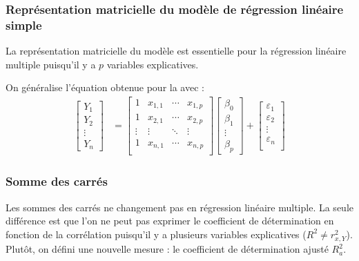 \documentclass[french]{article}
\begin{document}
\begin{multicols*}{2}
\subsubsection{Représentation matricielle du modèle de régression linéaire simple}
\begin{rappel_enhanced}[Contexte]
La représentation matricielle du modèle est essentielle pour la régression linéaire multiple puisqu'il y a $p$ variables explicatives. 
\end{rappel_enhanced}


On généralise l'équation obtenue pour la \textit{\underline{}}  avec : 
\begin{align*}
	\begin{bmatrix}
		Y_{1}	\\
		Y_{2}	\\
		\vdots	\\
		Y_{n}
	\end{bmatrix}
	&=	
	\begin{bmatrix}
		1	&	x_{1, 1}	&	\cdots	&	x_{1, p}	\\
		1	&	x_{2, 1}	&	\cdots	&	x_{2, p}	\\
	\vdots	&	\vdots	&	\ddots	&	\vdots	\\
		1	&	x_{n, 1}	&	\cdots	&	x_{n, p}	\\
	\end{bmatrix}
	\begin{bmatrix}
		\beta_{0}	\\
		\beta_{1}	\\
		\vdots		\\
		\beta_{p}
	\end{bmatrix} + 
	\begin{bmatrix}
		\varepsilon_{1}	\\
		\varepsilon_{2}	\\
		\vdots	\\
		\varepsilon_{n}	\\
	\end{bmatrix}
\end{align*}



\subsubsection{Somme des carrés}
\begin{rappel_enhanced}[Contexte]
Les sommes des carrés ne changement pas en régression linéaire multiple. La seule différence est que l'on ne peut pas exprimer le coefficient de détermination en fonction de la corrélation puisqu'il y a plusieurs variables explicatives ($R^{2} \neq r_{x, Y}^{2}$). Plutôt, on défini une nouvelle mesure : le coefficient de détermination ajusté $R_{a}^{2}$.
\end{rappel_enhanced}



\end{multicols*}
\end{document}
